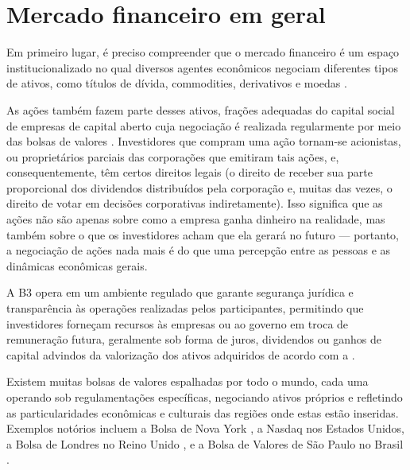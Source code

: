 \section{Mercado financeiro em geral} \label{sec:mercado}

Em primeiro lugar, é preciso compreender que o mercado financeiro é um espaço institucionalizado no qual diversos agentes econômicos negociam diferentes tipos de ativos, como títulos de dívida, commodities, derivativos e moedas \cite{MishkinEakins2018}. 


As ações também fazem parte desses ativos, frações adequadas do capital social de empresas de capital aberto cuja negociação é realizada regularmente por meio das bolsas de valores \cite{Lei6404}. Investidores que compram uma ação tornam-se acionistas, ou proprietários parciais das corporações que emitiram tais ações, e, consequentemente, têm certos direitos legais (o direito de receber sua parte proporcional dos dividendos distribuídos pela corporação e, muitas das vezes, o direito de votar em decisões corporativas indiretamente). Isso significa que as ações não são apenas sobre como a empresa ganha dinheiro na realidade, mas também sobre o que os investidores acham que ela gerará no futuro — portanto, a negociação de ações nada mais é do que uma percepção entre as pessoas e as dinâmicas econômicas gerais.

A B3 opera em um ambiente regulado que garante segurança jurídica e transparência às operações realizadas pelos participantes, permitindo que investidores forneçam recursos às empresas ou ao governo em troca de remuneração futura, geralmente sob forma de juros, dividendos ou ganhos de capital advindos da valorização dos ativos adquiridos de acordo com a \cite{Lei6385}. 

Existem muitas bolsas de valores espalhadas por todo o mundo, cada uma operando sob regulamentações específicas, negociando ativos próprios e refletindo as particularidades econômicas e culturais das regiões onde estas estão inseridas. Exemplos notórios incluem a Bolsa de Nova York \cite{NYSE}, a Nasdaq \cite{Nasdaq} nos Estados Unidos, a Bolsa de Londres no Reino Unido \cite{LSE}, e a Bolsa de Valores de São Paulo no Brasil \cite{B3}.



